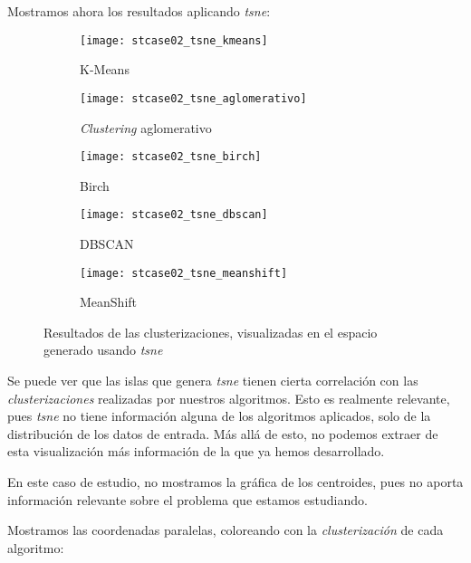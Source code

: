 \documentclass[11pt]{article}
\begin{document}
Mostramos ahora los resultados aplicando \emph{tsne}:

\begin{figure}[H]
    \centering

    \begin{subfigure}[b]{0.45 \textwidth}
        \texttt{[image: stcase02\_tsne\_kmeans]}
        \caption{K-Means}
    \end{subfigure}
    \begin{subfigure}[b]{0.45 \textwidth}
        \texttt{[image: stcase02\_tsne\_aglomerativo]}
        \caption{\emph{Clustering} aglomerativo}
    \end{subfigure}

    \begin{subfigure}[b]{0.45 \textwidth}
        \texttt{[image: stcase02\_tsne\_birch]}
        \caption{Birch}
    \end{subfigure}
    \begin{subfigure}[b]{0.45 \textwidth}
        \texttt{[image: stcase02\_tsne\_dbscan]}
        \caption{DBSCAN}
    \end{subfigure}

    \begin{subfigure}[b]{0.45 \textwidth}
        \texttt{[image: stcase02\_tsne\_meanshift]}
        \caption{MeanShift}
    \end{subfigure}

        \caption{Resultados de las clusterizaciones, visualizadas en el espacio generado usando \emph{tsne}}
\end{figure}

Se puede ver que las islas que genera \emph{tsne} tienen cierta correlación con las \emph{clusterizaciones} realizadas por nuestros algoritmos. Esto es realmente relevante, pues \emph{tsne} no tiene información alguna de los algoritmos aplicados, solo de la distribución de los datos de entrada. Más allá de esto, no podemos extraer de esta visualización más información de la que ya hemos desarrollado.

En este caso de estudio, no mostramos la gráfica de los centroides, pues no aporta información relevante sobre el problema que estamos estudiando.

Mostramos las coordenadas paralelas, coloreando con la \emph{clusterización} de cada algoritmo:
\end{document}
